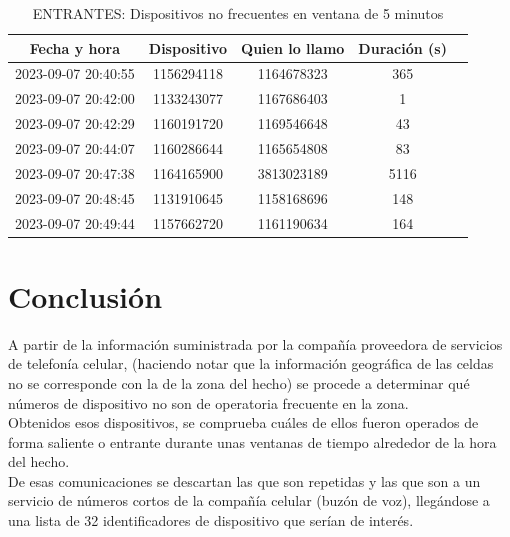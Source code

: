 \documentclass[12pt]{report}
\begin{document}
	\begin{table}[h]
		\centering
		\begin{tabular}{|c|c|c|c|c|}
			\hline
			Fecha y hora & Dispositivo & Quien lo llamo & Duración (s)  \\
			\hline
			2023-09-07 20:40:55 & 1156294118 & 1164678323  & 365   \\
			2023-09-07 20:42:00 & 1133243077 & 1167686403  & 1   \\
			2023-09-07 20:42:29 & 1160191720 & 1169546648  & 43   \\
			2023-09-07 20:44:07 & 1160286644 & 1165654808  & 83   \\
			2023-09-07 20:47:38 & 1164165900 & 3813023189  & 5116   \\
			2023-09-07 20:48:45 & 1131910645 & 1158168696  & 148   \\
			2023-09-07 20:49:44 & 1157662720 & 1161190634  & 164   \\
			\hline
		\end{tabular}
		\caption{ENTRANTES: Dispositivos no frecuentes en ventana de 5 minutos}
		\label{tab:t5}
	\end{table}
	\clearpage
	\section*{Conclusión}
	A partir de la información suministrada por la compañía proveedora de servicios de telefonía celular, (haciendo notar que la información geográfica de las celdas no se corresponde con la de la zona del hecho) se procede a determinar qué números de dispositivo no son de operatoria frecuente en la zona.\\
	Obtenidos esos dispositivos, se comprueba cuáles de ellos fueron operados de forma saliente o entrante durante unas ventanas de tiempo alrededor de la hora del hecho.\\
	De esas comunicaciones se descartan las que son repetidas y las que son a un servicio de números cortos de la compañía celular (buzón de voz), llegándose a una lista de 32 identificadores de dispositivo que serían de interés.\\
	
\end{document}
